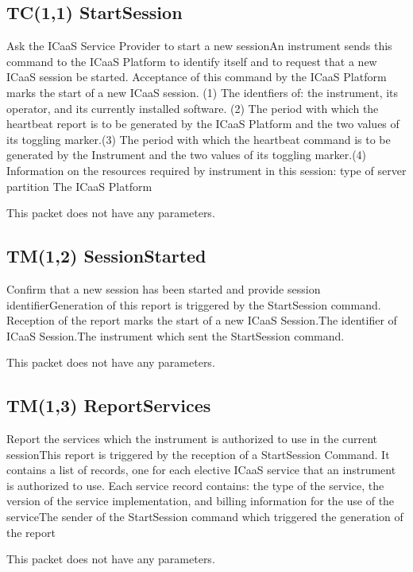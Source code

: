 \pagebreak
\subsection{TC(1,1) StartSession}
Ask the ICaaS Service Provider  to start a new sessionAn instrument sends this command to the ICaaS Platform to identify itself and to request that a new ICaaS session be started. Acceptance of this command by the ICaaS Platform marks the start of a new ICaaS session. (1) The identfiers of: the instrument, its operator, and its currently installed software. \newline (2) The period with which the heartbeat report is to be generated by the ICaaS Platform and the two values of its toggling marker.\newline (3) The period with which the heartbeat command is to be generated by the Instrument and the two values of its toggling marker.\newline (4) Information on the resources required by instrument in this session: type of server partition The ICaaS Platform

This packet does not have any parameters.

\pagebreak
\subsection{TM(1,2) SessionStarted}
Confirm that a new session has been started and provide session identifierGeneration of this report is triggered by the StartSession command. Reception of the report marks the start of a new ICaaS Session.The identifier of ICaaS Session.The instrument which sent the StartSession command.

This packet does not have any parameters.

\pagebreak
\subsection{TM(1,3) ReportServices}
Report the services which the instrument is authorized to use in the current sessionThis report is triggered by the reception of a StartSession Command. It contains a list of records, one for each elective ICaaS service that an instrument is authorized to use. Each service record contains: the type of the service, the version of the service implementation, and billing information for the use of the serviceThe sender of the StartSession command which triggered the generation of the report

This packet does not have any parameters.

